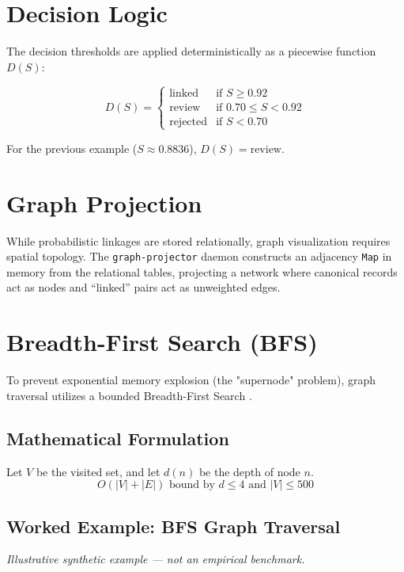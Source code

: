 \section{Decision Logic}
\label{sec:meth-decision}
The decision thresholds are applied deterministically as a piecewise function $D(S)$:

\begin{equation}
D(S) = \begin{cases}
\text{linked} & \text{if } S \geq 0.92 \\
\text{review} & \text{if } 0.70 \leq S < 0.92 \\
\text{rejected} & \text{if } S < 0.70
\end{cases}
\label{eq:decision}
\end{equation}

For the previous example ($S \approx 0.8836$), $D(S) = \text{review}$.

\section{Graph Projection}
\label{sec:meth-projection}
While probabilistic linkages are stored relationally, graph visualization requires spatial topology. 
The \texttt{graph-projector} daemon constructs an adjacency \texttt{Map} in memory from the relational 
tables, projecting a network where canonical records act as nodes and ``linked'' pairs act as 
unweighted edges. 

\section{Breadth-First Search (BFS)}
\label{sec:meth-bfs}
To prevent exponential memory explosion (the "supernode" problem), graph traversal utilizes a bounded 
Breadth-First Search \cite{cormen2009introduction}.

\subsection{Mathematical Formulation}
Let $V$ be the visited set, and let $d(n)$ be the depth of node $n$.
\begin{equation}
O(|V| + |E|) \text{ bound by } d \le 4 \text{ and } |V| \le 500
\label{eq:bfs-complexity}
\end{equation}

\subsection{Worked Example: BFS Graph Traversal}
\textit{Illustrative synthetic example — not an empirical benchmark.}

